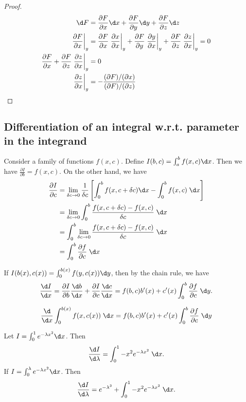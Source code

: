 \documentclass[a4paper]{article}
\begin{document}
\begin{proof}
  \begin{align*}
  \d F &= \frac{\partial F}{\partial x}\d x + \frac{\partial F}{\partial y}\d y + \frac{\partial F}{\partial z}\d z\\
  \left.\frac{\partial F}{\partial x}\right|_y &= \frac{\partial F}{\partial x}\left.\frac{\partial x}{\partial x}\right|_y + \frac{\partial F}{\partial y}\left.\frac{\partial y}{\partial x}\right|_y + \frac{\partial F}{\partial z}\left.\frac{\partial z}{\partial x}\right|_y = 0\\
  \frac{\partial F}{\partial x} + \frac{\partial F}{\partial z}\left.\frac{\partial z}{\partial x}\right|_y &= 0\\
  \left.\frac{\partial z}{\partial x}\right|_y &= -\frac{(\partial F)/(\partial x)}{(\partial F)/(\partial z)}
\end{align*}
\end{proof}
\subsection{Differentiation of an integral w.r.t. parameter in the integrand}
Consider a family of functions $f(x, c)$. Define $I(b, c) = \int_a^bf(x, c)\d x$. Then we have $\frac{\partial I}{\partial b} = f(x, c)$. On the other hand, we have
\begin{align*}
  \frac{\partial I}{\partial c} &= \lim_{\delta c\to 0}\frac{1}{\delta c}\left[\int_0^bf(x, c + \delta c)\d x - \int_0^b f(x, c)\;\d x\right]\\
  &= \lim_{\delta c\to 0}\int_0^b\frac{f(x, c + \delta c) - f(x, c)}{\delta c}\;\d x\\
  &= \int_0^b\lim_{\delta c\to 0}\frac{f(x, c + \delta c) - f(x, c)}{\delta c}\;\d x\\
  &= \int_0^b\frac{\partial f}{\partial c}\;\d x
\end{align*}

If $I(b(x), c(x)) = \int_0^{b(x)} f(y, c(x))\d y$, then by the chain rule, we have
\[
\frac{\d I}{\d x} = \frac{\partial I}{\partial b}\frac{\d b}{\d x} + \frac{\partial I}{\partial c}\frac{\d c}{\d x} = f(b, c)b'(x) + c'(x) \int_0^b\frac{\partial f}{\partial c}\;\d y.
\]

\begin{thm}
  \[
  \frac{\d}{\d x} \int_{0}^{b(x)} f(x, c(x))\;\d x= f(b, c)b'(x) + c'(x)\int_0^b \frac{\partial f}{\partial c}\;\d y
  \]
\end{thm}
\begin{eg}
  Let $I = \int_0^1 e^{-\lambda x^2}\d x$. Then
  \[
  \frac{\d I}{\d \lambda} = \int_0^1-x^2e^{-\lambda x^2}\;\d x.
  \]
  If $I = \int_0^\lambda e^{-\lambda x^2}\d x$. Then
  \[
  \frac{\d I}{\d \lambda} = e^{-\lambda^3} + \int_0^1-x^2e^{-\lambda x^2}\;\d x.
  \]
\end{eg}
\end{document}
